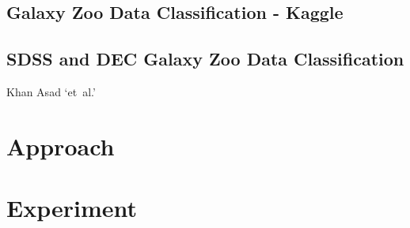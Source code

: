 \documentclass{article}
\begin{document}
\subsection{Galaxy Zoo Data Classification - Kaggle}

\subsection{SDSS and DEC Galaxy Zoo Data Classification}
Khan Asad `et~al.'

















\section{Approach}



















\section{Experiment}
\end{document}

